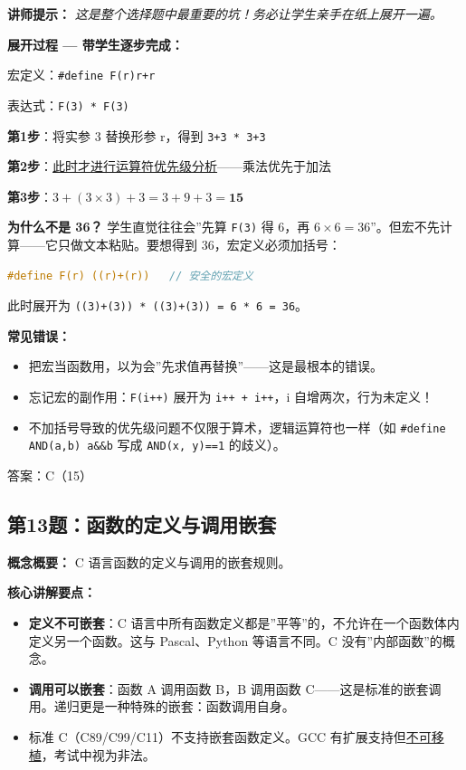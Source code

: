 \smallskip
\textbf{讲师提示：} \textit{这是整个选择题中最重要的坑！务必让学生亲手在纸上展开一遍。}

\textbf{展开过程 — 带学生逐步完成：}

\noindent 宏定义：\texttt{\#define F(r)\quad r+r}

\noindent 表达式：\texttt{F(3) * F(3)}

\noindent \textbf{第1步}：将实参 3 替换形参 r，得到 \texttt{3+3 * 3+3}

\noindent \textbf{第2步}：\underline{此时才进行运算符优先级分析}——乘法优先于加法

\noindent \textbf{第3步}：$3 + (3 \times 3) + 3 = 3 + 9 + 3 = \mathbf{15}$

\bigskip
\textbf{为什么不是 36？} 学生直觉往往会”先算 \texttt{F(3)} 得 6，再 $6 \times 6 = 36$”。但宏不先计算——它只做文本粘贴。要想得到 36，宏定义必须加括号：

\begin{lstlisting}[language=C]
#define F(r) ((r)+(r))   // 安全的宏定义
\end{lstlisting}

\noindent 此时展开为 \texttt{((3)+(3)) * ((3)+(3)) = 6 * 6 = 36}。

\textbf{常见错误：}
\begin{itemize}
    \item 把宏当函数用，以为会”先求值再替换”——这是最根本的错误。
    \item 忘记宏的副作用：\texttt{F(i++)} 展开为 \texttt{i++ + i++}，i 自增两次，行为未定义！
    \item 不加括号导致的优先级问题不仅限于算术，逻辑运算符也一样（如 \texttt{\#define AND(a,b) a\&\&b} 写成 \texttt{AND(x, y)==1} 的歧义）。
\end{itemize}

{\color{highlight}答案：C（15）}

\subsection{第13题：函数的定义与调用嵌套}

\textbf{概念概要：} C 语言函数的定义与调用的嵌套规则。

\textbf{核心讲解要点：}
\begin{itemize}
    \item \textbf{定义不可嵌套}：C 语言中所有函数定义都是”平等”的，不允许在一个函数体内定义另一个函数。这与 Pascal、Python 等语言不同。C 没有”内部函数”的概念。
    \item \textbf{调用可以嵌套}：函数 A 调用函数 B，B 调用函数 C——这是标准的嵌套调用。递归更是一种特殊的嵌套：函数调用自身。
    \item 标准 C（C89/C99/C11）不支持嵌套函数定义。GCC 有扩展支持但\underline{不可移植}，考试中视为非法。
\end{itemize}

